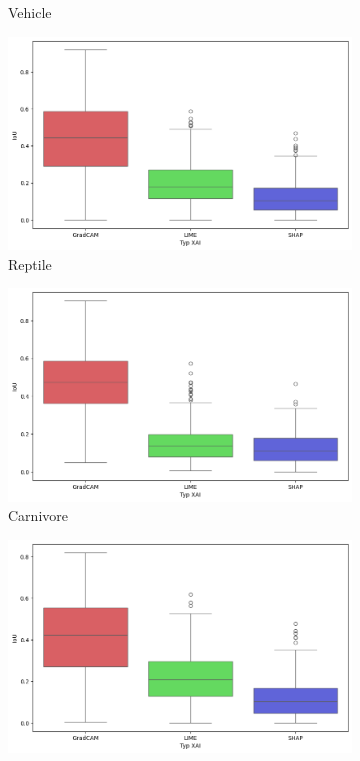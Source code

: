 \begin{figure}[h]
\begin{subfigure}[b]{0.3\textwidth}
		\caption{Vehicle}
	\end{subfigure}
	\begin{subfigure}[b]{0.3\textwidth}
		\centering\includegraphics[width=.9\textwidth]{img/base_iou_reptile}
		\caption{Reptile}
	\end{subfigure}
	\begin{subfigure}[b]{0.3\textwidth}
		\centering\includegraphics[width=.9\textwidth]{img/base_iou_carnivore}
		\caption{Carnivore}
	\end{subfigure}
	\begin{subfigure}[b]{0.3\textwidth}
		\centering\includegraphics[width=.9\textwidth]{img/base_iou_insect}

\end{subfigure}
\end{figure}

